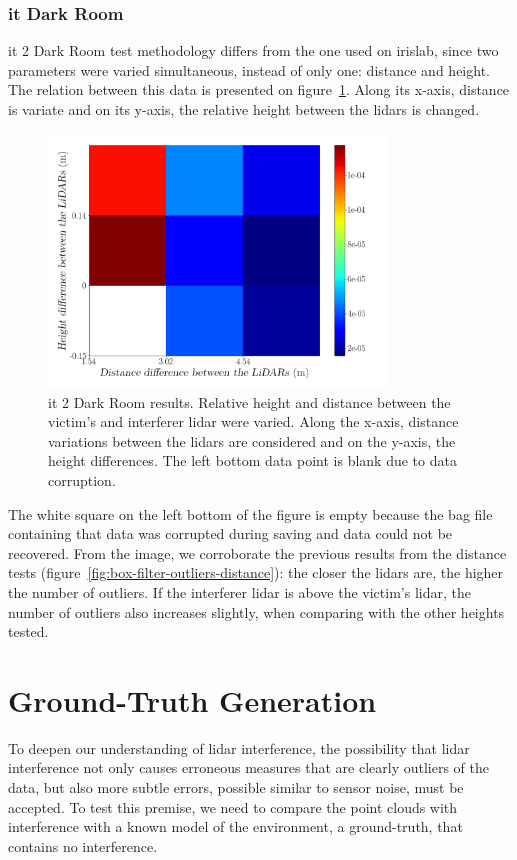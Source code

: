 \subsubsection{\ac{it} Dark Room}
\ac{it} 2 Dark Room test methodology differs from the one used on \ac{irislab}, since two parameters were varied simultaneous, instead of only one: distance and height. The relation between this data is presented on figure~\ref{fig:box-filter-outliers-it2}. Along its x-axis, distance is variate and on its y-axis, the relative height between the \acp{lidar} is changed.

\begin{figure}[!ht]
	\centering
	\includegraphics[width=0.8\textwidth]{img/lidar-interference/box-filtering/interference-box-filter-outliers-it2.png}
	\caption{\ac{it} 2 Dark Room results. Relative height and distance between the victim's and interferer \ac{lidar} were varied. Along the x-axis, distance variations between the \acp{lidar} are considered and on the y-axis, the height differences. The left bottom data point is blank due to data corruption.}
	\label{fig:box-filter-outliers-it2}
\end{figure}

The white square on the left bottom of the figure is empty because the bag file containing that data was corrupted during saving and data could not be recovered. From the image, we corroborate the previous results from the distance tests (figure~\ref{fig:box-filter-outliers-distance}): the closer the \acp{lidar} are, the higher the number of outliers. If the interferer \ac{lidar} is above the victim's \ac{lidar}, the number of outliers also increases slightly, when comparing with the other heights tested.

\section{Ground-Truth Generation}
\label{sec:lidar-interference:ground-truth-generation}
To deepen our understanding of \ac{lidar} interference, the possibility that \ac{lidar} interference not only causes erroneous measures that are clearly outliers of the data, but also more subtle errors, possible similar to sensor noise, must be accepted. To test this premise, we need to compare the point clouds with interference with a known model of the environment, a ground-truth, that contains no interference.  

